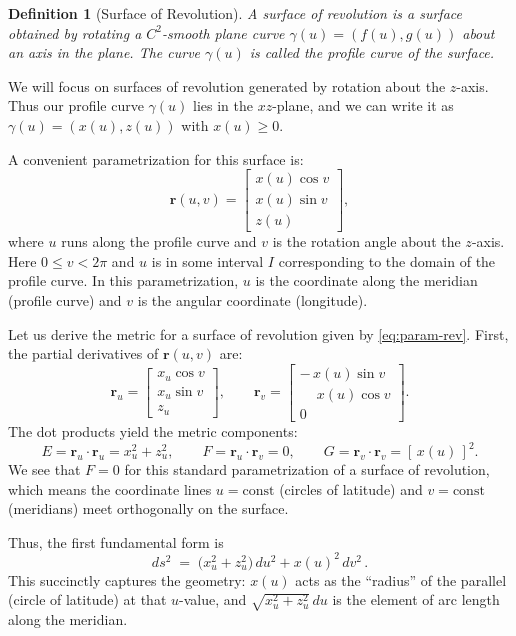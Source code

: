 \documentclass[12pt]{article}
\newtheorem{definition}{Definition}[section]
\begin{document}
\begin{definition}[Surface of Revolution]\label{def:surf-rev}
A surface of revolution is a surface obtained by rotating a $C^{2}$-smooth plane curve $\gamma(u) = (f(u), g(u))$ about an axis in the plane. 
The curve $\gamma(u)$ is called the \emph{profile curve} of the surface. 
\end{definition}
We will focus on surfaces of revolution generated by rotation about the $z$-axis.
Thus our profile curve $\gamma(u)$ lies in the $xz$-plane, and we can write it as $\gamma(u) = (x(u), z(u))$ with $x(u)\ge 0$.

A convenient parametrization for this surface is:
\begin{equation}\label{eq:param-rev}
\mathbf{r}(u,v) = \begin{bmatrix}
x(u)\cos v\\[1ex]
x(u)\sin v\\[1ex]
z(u)
\end{bmatrix}, 
\end{equation}
where $u$ runs along the profile curve and $v$ is the rotation angle about the $z$-axis. 
Here $0 \le v < 2\pi$ and $u$ is in some interval $I$ corresponding to the domain of the profile curve. 
In this parametrization, $u$ is the coordinate along the meridian (profile curve) and $v$ is the angular coordinate (longitude).

Let us derive the metric for a surface of revolution given by \eqref{eq:param-rev}. 
First, the partial derivatives of $\mathbf{r}(u,v)$ are:
\[
\mathbf{r}_u = \begin{bmatrix} x_{u}\cos v \\ x_{u}\sin v \\ z_{u} \end{bmatrix}, \qquad 
\mathbf{r}_v = \begin{bmatrix} -\,x(u)\sin v \\ \phantom{-}x(u)\cos v \\ 0 \end{bmatrix}.
\]
The dot products yield the metric components:
\[
E = \mathbf{r}_u \cdot \mathbf{r}_u = x_{u}^{2} + z_{u}^{2}, \qquad 
F = \mathbf{r}_u \cdot \mathbf{r}_v = 0, \qquad 
G = \mathbf{r}_v \cdot \mathbf{r}_v = [\,x(u)\,]^{2}.
\]
We see that $F=0$ for this standard parametrization of a surface of revolution, which means the coordinate lines $u=\text{const}$ (circles of latitude) and $v=\text{const}$ (meridians) meet orthogonally on the surface. 

Thus, the first fundamental form is
\begin{equation}\label{eq:metric-rev}
ds^{2} \;=\; \big(x_{u}^{2} + z_{u}^{2}\big)\,du^{2} + x(u)^{2}\,dv^{2}\,.
\end{equation}
This succinctly captures the geometry: $x(u)$ acts as the “radius” of the parallel (circle of latitude) at that $u$-value, and $\sqrt{x_{u}^{2}+z_{u}^{2}}\,du$ is the element of arc length along the meridian.
\end{document}
